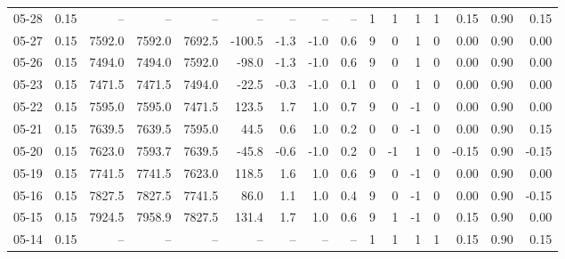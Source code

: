 \begin{threeparttable}
{\begin{tabular}{lrrrrrrrrrrrrrrr}
  05-28 &     0.15 &     -- &     -- &     -- &         -- &             -- &                       -- &                  -- &              1 &         1 &     1 &         1 &       0.15 &      0.90 &           0.15 \\
  05-27 &     0.15 & 7592.0 & 7592.0 & 7692.5 &     -100.5 &           -1.3 &                     -1.0 &                 0.6 &              9 &         0 &     1 &         0 &       0.00 &      0.90 &           0.00 \\
  05-26 &     0.15 & 7494.0 & 7494.0 & 7592.0 &      -98.0 &           -1.3 &                     -1.0 &                 0.6 &              9 &         0 &     1 &         0 &       0.00 &      0.90 &           0.00 \\
  05-23 &     0.15 & 7471.5 & 7471.5 & 7494.0 &      -22.5 &           -0.3 &                     -1.0 &                 0.1 &              0 &         0 &     1 &         0 &       0.00 &      0.90 &           0.00 \\
  05-22 &     0.15 & 7595.0 & 7595.0 & 7471.5 &      123.5 &            1.7 &                      1.0 &                 0.7 &              9 &         0 &    -1 &         0 &       0.00 &      0.90 &           0.00 \\
  05-21 &     0.15 & 7639.5 & 7639.5 & 7595.0 &       44.5 &            0.6 &                      1.0 &                 0.2 &              0 &         0 &    -1 &         0 &       0.00 &      0.90 &           0.15 \\
  05-20 &     0.15 & 7623.0 & 7593.7 & 7639.5 &      -45.8 &           -0.6 &                     -1.0 &                 0.2 &              0 &        -1 &     1 &         0 &      -0.15 &      0.90 &          -0.15 \\
  05-19 &     0.15 & 7741.5 & 7741.5 & 7623.0 &      118.5 &            1.6 &                      1.0 &                 0.6 &              9 &         0 &    -1 &         0 &       0.00 &      0.90 &           0.00 \\
  05-16 &     0.15 & 7827.5 & 7827.5 & 7741.5 &       86.0 &            1.1 &                      1.0 &                 0.4 &              9 &         0 &    -1 &         0 &       0.00 &      0.90 &          -0.15 \\
  05-15 &     0.15 & 7924.5 & 7958.9 & 7827.5 &      131.4 &            1.7 &                      1.0 &                 0.6 &              9 &         1 &    -1 &         0 &       0.15 &      0.90 &           0.00 \\
  05-14 &     0.15 &     -- &     -- &     -- &         -- &             -- &                       -- &                  -- &              1 &         1 &     1 &         1 &       0.15 &      0.90 &           0.15 \\

\end{tabular}}
\end{threeparttable}
